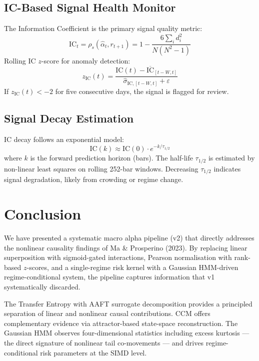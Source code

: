 \documentclass[11pt]{article}
\begin{document}
\subsection{IC-Based Signal Health Monitor}

The Information Coefficient is the primary signal quality metric:
\begin{equation}
\text{IC}_t = \rho_s(\hat{\alpha}_t, r_{t+1}) = 1 - \frac{6\sum_i d_i^2}{N(N^2-1)}
\label{eq:ic}
\end{equation}
Rolling IC $z$-score for anomaly detection:
\begin{equation}
z_{\text{IC}}(t) = \frac{\text{IC}(t) - \overline{\text{IC}}_{[t-W,t]}}{\hat{\sigma}_{\text{IC},[t-W,t]} + \varepsilon}
\label{eq:ic-zscore}
\end{equation}
If $z_{\text{IC}}(t) < -2$ for five consecutive days, the signal is flagged for review.

\subsection{Signal Decay Estimation}

IC decay follows an exponential model:
\begin{equation}
\text{IC}(k) \approx \text{IC}(0) \cdot e^{-k/\tau_{1/2}}
\label{eq:ic-decay}
\end{equation}
where $k$ is the forward prediction horizon (bars). The half-life $\tau_{1/2}$ is estimated by non-linear least squares on rolling 252-bar windows. Decreasing $\tau_{1/2}$ indicates signal degradation, likely from crowding or regime change.

\section{Conclusion}

We have presented a systematic macro alpha pipeline (v2) that directly addresses the nonlinear causality findings of Ma \& Prosperino (2023). By replacing linear superposition with sigmoid-gated interactions, Pearson normalisation with rank-based $z$-scores, and a single-regime risk kernel with a Gaussian HMM-driven regime-conditional system, the pipeline captures information that v1 systematically discarded.

The Transfer Entropy with AAFT surrogate decomposition provides a principled separation of linear and nonlinear causal contributions. CCM offers complementary evidence via attractor-based state-space reconstruction. The Gaussian HMM observes four-dimensional statistics including excess kurtosis --- the direct signature of nonlinear tail co-movements --- and drives regime-conditional risk parameters at the SIMD level.
\end{document}
